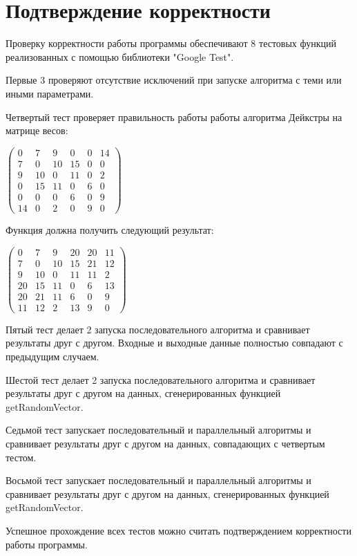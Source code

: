 \documentclass{report}
\begin{document}
\section*{Подтверждение корректности}
\par Проверку корректности работы программы обеспечивают 8 тестовых функций реализованных с помощью библиотеки "Google Test".
\par Первые 3 проверяют отсутствие исключений при запуске алгоритма с теми или иными параметрами.
\par Четвертый тест проверяет правильность работы работы алгоритма Дейкстры на матрице весов:
\par
$\begin{pmatrix}
  0 & 7 & 9 & 0 & 0 & 14\\
  7 & 0 & 10 & 15 & 0 & 0\\
  9 & 10 & 0 & 11 & 0 & 2\\
  0 & 15 & 11 & 0 & 6 & 0\\
  0 & 0 & 0 & 6 & 0 & 9\\
  14 & 0 & 2 & 0 & 9 & 0
\end{pmatrix}$
\par Функция должна получить следующий результат:
\par
$\begin{pmatrix}
 0 & 7 & 9 & 20 & 20 & 11\\
 7 & 0 &  10 & 15 & 21 & 12\\
 9 & 10 & 0 & 11 & 11 & 2\\
 20 & 15 & 11 & 0 & 6 & 13\\
 20 & 21 & 11 & 6 & 0 & 9\\
 11 & 12 & 2 & 13 & 9 & 0
\end{pmatrix}$
\par Пятый тест делает 2 запуска последовательного алгоритма и сравнивает результаты друг с другом. Входные и выходные данные полностью совпадают с предыдущим случаем.
\par Шестой тест делает 2 запуска последовательного алгоритма и сравнивает результаты друг с другом на данных, сгенерированных функцией getRandomVector.
\par Седьмой тест запускает последовательный и параллельный алгоритмы и сравнивает результаты друг с другом на данных, совпадающих с четвертым тестом.
\par Восьмой тест запускает последовательный и параллельный алгоритмы и сравнивает результаты друг с другом на данных, сгенерированных функцией getRandomVector.
\par Успешное прохождение всех тестов можно считать подтверждением корректности работы программы.
\newpage
\end{document}
